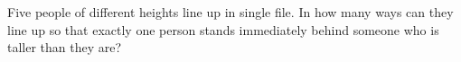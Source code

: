 Five people of different heights line up in single file. In how many ways can they line up so that exactly one person stands immediately behind someone who is taller than they are?
